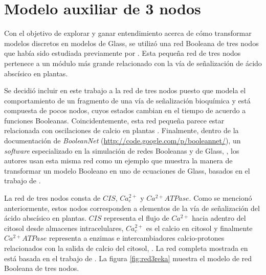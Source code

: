 \chapter{Modelo auxiliar de 3 nodos}\label{ch:3Nodos}

Con el objetivo de explorar y ganar entendimiento acerca de cómo transformar modelos discretos en modelos de Glass, se utilizó una red Booleana de tres nodos que había sido estudiada previamente por \citeauthor{Reka3Nodos2010} \citep{Reka3Nodos2010}. Esta pequeña red de tres nodos pertenece a un módulo más grande relacionado con la vía de señalización de ácido abscísico en plantas. 

Se decidió incluir en este trabajo a la red de tres nodos puesto que modela el comportamiento de un fragmento de una vía de señalización bioquímica y está compuesta de pocos nodos, cuyos estados cambian en el tiempo de acuerdo a funciones Booleanas. Coincidentemente, esta red pequeña parece estar relacionada con oscilaciones de calcio en plantas \citeauthor{Reka3Nodos2010} \citep{Reka3Nodos2010}. Finalmente, dentro de la documentación de \emph{BooleanNet} (\url{http://code.google.com/p/booleannet/}), un \emph{software} especializado en la simulación de redes Booleanas y de Glass, \citeauthor{Albert:2008dv} \citep{Albert:2008dv}, los autores usan esta misma red como un ejemplo que muestra la manera de transformar un modelo Booleano en uno de ecuaciones de Glass, basados en el trabajo de \citeauthor{LiAlbert2006} \citep{LiAlbert2006}.

La red de tres nodos consta de $CIS$, $Ca^{2+}_c$ y $Ca^{2+}ATPase$. Como se mencionó anteriormente, estos nodos corresponden a elementos de la vía de señalización del ácido abscísico en plantas. $CIS$ representa el flujo de $Ca^{2+}$ hacia adentro del citosol desde almacenes intracelulares, $Ca^{2+}_c$ es el calcio en citosol y finalmente $Ca^{2+}ATPase$ representa a enzimas e intercambiadores calcio-protones relacionados con la salida de calcio del citosol, \citeauthor{Reka3Nodos2010} \citep{Reka3Nodos2010}. La red completa mostrada en \citeauthor{Reka3Nodos2010} \citep{Reka3Nodos2010} está basada en el trabajo de  \citeauthor{LiAlbert2006} \citep{LiAlbert2006}. La figura \ref{fig:red3reka} muestra el modelo de red Booleana de tres nodos.

